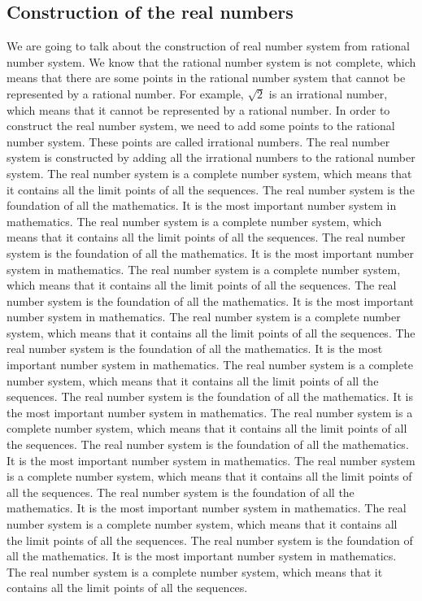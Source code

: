 \documentclass{article}
\begin{document}
\subsection{Construction of the real numbers}
We are going to talk about the construction of real number system from rational number system. We know that the rational number system is not complete, which means that there are some points in the rational number system that cannot be represented by a rational number.
For example, $\sqrt{2}$ is an irrational number, which means that it cannot be represented by a rational number.
In order to construct the real number system, we need to add some points to the rational number system.
These points are called irrational numbers. The real number system is constructed by adding all the irrational numbers to the rational number system.
The real number system is a complete number system, which means that it contains all the limit points of all the sequences.
The real number system is the foundation of all the mathematics. It is the most important number system in mathematics.
The real number system is a complete number system, which means that it contains all the limit points of all the sequences.
The real number system is the foundation of all the mathematics. It is the most important number system in mathematics.
The real number system is a complete number system, which means that it contains all the limit points of all the sequences. The real number system is the foundation of all the mathematics. It is the most important number system in mathematics. The real number system is a complete number system, which means that it contains all the limit points of all the sequences. The real number system is the foundation of all the mathematics. It is the most important number system in mathematics. The real number system is a complete number system, which means that it contains all the limit points of all the sequences. The real number system is the foundation of all the mathematics. It is the most important number system in mathematics. The real number system is a complete number system, which means that it contains all the limit points of all the sequences. The real number system is the foundation of all the mathematics. It is the most important number system in mathematics. The real number system is a complete number system, which means that it contains all the limit points of all the sequences. The real number system is the foundation of all the mathematics. It is the most important number system in mathematics. The real number system is a complete number system, which means that it contains all the limit points of all the sequences. The real number system is the foundation of all the mathematics. It is the most important number system in mathematics. The real number system is a complete number system, which means that it contains all the limit points of all the sequences.
\end{document}
